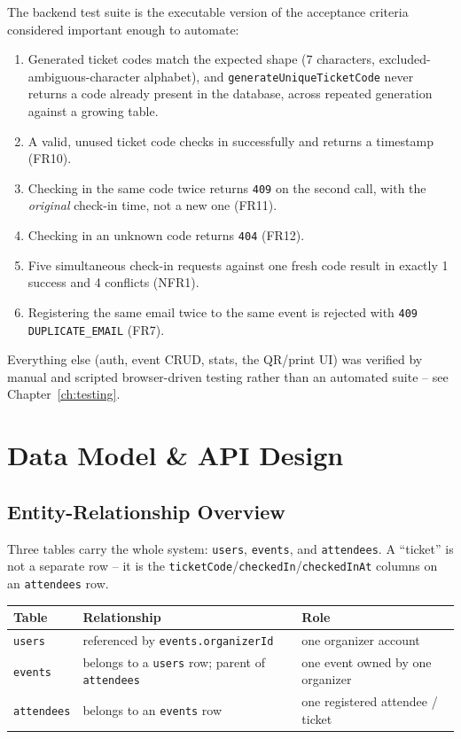 ﻿\documentclass[11pt,letterpaper]{report}
\newcommand{\code}[1]{\lstinline[breaklines=true]{#1}}
\begin{document}
The backend test suite is the executable version of the acceptance
criteria considered important enough to automate:

\begin{enumerate}[leftmargin=1.8em]
  \item Generated ticket codes match the expected shape (7 characters,
    excluded-ambiguous-character alphabet), and
    \code{generateUniqueTicketCode} never returns a code already
    present in the database, across repeated generation against a
    growing table.
  \item A valid, unused ticket code checks in successfully and
    returns a timestamp (FR10).
  \item Checking in the same code twice returns \code{409} on the
    second call, with the \emph{original} check-in time, not a new
    one (FR11).
  \item Checking in an unknown code returns \code{404} (FR12).
  \item Five simultaneous check-in requests against one fresh code
    result in exactly 1 success and 4 conflicts (NFR1).
  \item Registering the same email twice to the same event is
    rejected with \code{409 DUPLICATE_EMAIL} (FR7).
\end{enumerate}

Everything else (auth, event CRUD, stats, the QR/print UI) was
verified by manual and scripted browser-driven testing rather than an
automated suite -- see Chapter~\ref{ch:testing}.

\chapter{Data Model \& API Design}
\label{ch:design}

\section{Entity-Relationship Overview}

Three tables carry the whole system: \code{users}, \code{events}, and
\code{attendees}. A ``ticket'' is not a separate row -- it is the
\code{ticketCode}/\code{checkedIn}/\code{checkedInAt} columns on an
\code{attendees} row.

\begin{center}
\begin{tabular}{p{2.6cm}p{5.5cm}p{5.5cm}}
\toprule
\textbf{Table} & \textbf{Relationship} & \textbf{Role} \\
\midrule
\code{users} & referenced by \code{events.organizerId} & one organizer account \\
\code{events} & belongs to a \code{users} row; parent of \code{attendees} & one event owned by one organizer \\
\code{attendees} & belongs to an \code{events} row & one registered attendee / ticket \\
\bottomrule
\end{tabular}
\end{center}
\end{document}
